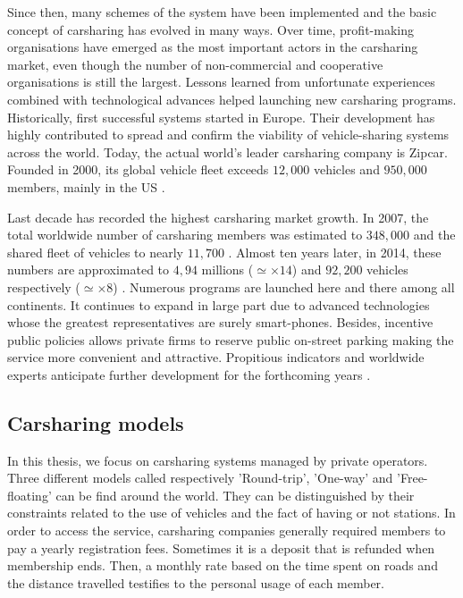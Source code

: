 \medskip
Since then, many schemes of the system have been implemented and the basic concept of carsharing has evolved in many ways.
Over time, profit-making organisations have emerged as the most important actors in the carsharing market, even though the number of non-commercial and cooperative organisations is still the largest.
Lessons learned from unfortunate experiences combined with technological advances helped launching new carsharing programs.
Historically, first successful systems started in Europe.
Their development has highly contributed to spread and confirm the viability of vehicle-sharing systems across the world.
Today, the actual world's leader carsharing company is Zipcar.
Founded in 2000, its global vehicle fleet exceeds $12,000$ vehicles and $950,000$ members, mainly in the US \cite{zipcar_website}.

\medskip
Last decade has recorded the highest carsharing market growth.
In 2007, the total worldwide number of carsharing members was estimated to $348,000$ and the shared fleet of vehicles to nearly $11,700$ \cite{shaheen_growth_2007}.
Almost ten years later, in 2014, these numbers are approximated to $4,94$ millions ($\simeq \times 14$) and $92,200$ vehicles respectively ($\simeq \times 8$) \cite{statista_carsharingNumbers}.
Numerous programs are launched here and there among all continents.
It continues to expand in large part due to advanced technologies whose the greatest representatives are surely smart-phones.
Besides, incentive public policies allows private firms to reserve public on-street parking making the service more convenient and attractive.
Propitious indicators and worldwide experts anticipate further development for the forthcoming years \cite{shaheen_carsharing_2013}.







\subsection{Carsharing models}
In this thesis, we focus on carsharing systems managed by private operators.
Three different models called respectively 'Round-trip', 'One-way' and 'Free-floating' can be find around the world.
They can be distinguished by their constraints related to the use of vehicles and the fact of having or not stations.
In order to access the service, carsharing companies generally required members to pay a yearly registration fees.
Sometimes it is a deposit that is refunded when membership ends.
Then, a monthly rate based on the time spent on roads and the distance travelled testifies to the personal usage of each member.

